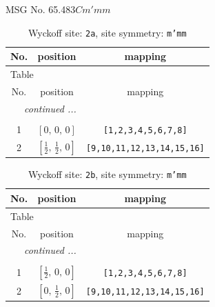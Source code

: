 \documentclass[fleqn,8pt]{jsarticle}
\begin{document}
\setcounter{MaxMatrixCols}{32}

\renewcommand{\tablename}{Table~}
\renewcommand{\figurename}{Figure~}
\begin{center}
\LARGE
MSG No. 65.483\quad$Cm'mm$
\end{center}
\renewcommand{\arraystretch}{1.2}
\begin{longtable}{ccc}
\caption{Wyckoff site: {\tt 2a}, site symmetry: {\tt m'mm}}
 \\
 \hline \hline
No. & position & mapping \\ \hline \endfirsthead

\multicolumn{2}{l}{\tablename\ \thetable{}} \\
 \hline \hline
No. & position & mapping \\ \hline \endhead

 \hline \hline
\multicolumn{2}{r}{\footnotesize\it continued ...} \\ \endfoot

 \hline \hline
\multicolumn{2}{r}{} \\ \endlastfoot

1 & $\left[ 0,\, 0,\, 0 \right]$ & {\tt [1,2,3,4,5,6,7,8]} \\ \hline
2 & $\left[ \frac{1}{2},\, \frac{1}{2},\, 0 \right]$ & {\tt [9,10,11,12,13,14,15,16]} \\
\end{longtable}
\renewcommand{\arraystretch}{1.2}
\begin{longtable}{ccc}
\caption{Wyckoff site: {\tt 2b}, site symmetry: {\tt m'mm}}
 \\
 \hline \hline
No. & position & mapping \\ \hline \endfirsthead

\multicolumn{2}{l}{\tablename\ \thetable{}} \\
 \hline \hline
No. & position & mapping \\ \hline \endhead

 \hline \hline
\multicolumn{2}{r}{\footnotesize\it continued ...} \\ \endfoot

 \hline \hline
\multicolumn{2}{r}{} \\ \endlastfoot

1 & $\left[ \frac{1}{2},\, 0,\, 0 \right]$ & {\tt [1,2,3,4,5,6,7,8]} \\ \hline
2 & $\left[ 0,\, \frac{1}{2},\, 0 \right]$ & {\tt [9,10,11,12,13,14,15,16]} \\
\end{longtable}
\end{document}
